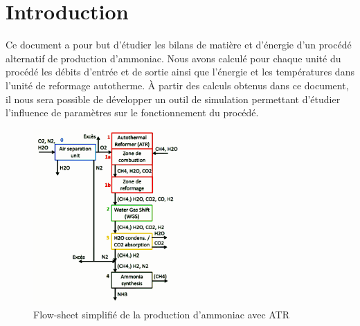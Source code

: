 \documentclass[french, a4paper, 10pt]{article}
\begin{document}

\tableofcontents\newpage

\part{Introduction}
Ce document a pour but d'étudier les bilans de matière et d'énergie d'un procédé alternatif de production d'ammoniac. Nous avons calculé pour chaque unité du procédé les débits d'entrée et de sortie ainsi que l'énergie et les températures dans l'unité de reformage autotherme. À partir des calculs obtenus dans ce document, il nous sera possible de développer un outil de simulation permettant d'étudier l'influence de paramètres sur le fonctionnement du procédé. 
\begin{figure}[h]
	\centering
	\includegraphics[width=0.5\textwidth]{pictures/procede.pdf}
	\caption{\label{fig:procede}Flow-sheet simplifié de la production d'ammoniac avec ATR}
\end{figure}
\end{document}
